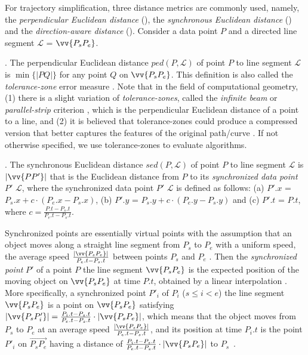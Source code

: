  For trajectory simplification, three distance metrics are commonly used, namely, the \emph{perpendicular Euclidean distance} (\ped), the \emph{synchronous Euclidean distance} \cite{Meratnia:Spatiotemporal} (\sed) and the \emph{direction-aware distance}\cite{Long:Direction, Zhang:Evaluation} (\dad).
%
Consider a data point $P$ and a directed line segment $\mathcal{L}$ = $\vv{P_{s}P_{e}}$.

. The perpendicular Euclidean distance $ped\left(P, \mathcal{L}\right)$ of point $P$ to line segment $\mathcal{L}$ is $\min\{|PQ|\}$ for any point $Q$ on $\vv{P_{s}P_{e}}$.
%
{This definition is also called the \emph{tolerance-zone} error measure \cite{Daescu:metric,Barequet:3D,Chen:Space,Imai:Optimal,Melkman:Optimal}.}
{Note that in the field of computational geometry, (1) there is a slight variation of \emph{tolerance-zones}, called the \emph{infinite beam} or \emph{parallel-strip} criterion \cite{Daescu:metric,Chen:Space}, which is the perpendicular Euclidean distance of a point to a line, and (2) it is believed that tolerance-zones could produce a compressed version that better captures the features of the original path/curve \cite{Daescu:metric,Barequet:3D,Chen:Space}. If not otherwise specified, we use tolerance-zones to evaluate algorithms.}
	
. The synchronous Euclidean distance $sed\left(P, \mathcal{L}\right)$ of point $P$ to line segment $\mathcal{L}$ is $|\vv{PP'}|$ that is the Euclidean distance from $P$ to its \textit{synchronized data point} $P'$ \wrt $\mathcal{L}$, where the synchronized data point $P'$ \wrt $\mathcal{L}$ is defined as follows:
(a) $P'.x$ = $P_s.x +  c\cdot\left(P_e.x - P_s.x\right)$,
(b) $P'.y$ = $P_s.y +  c\cdot\left(P_e.y - P_s.y\right)$ and
(c) $P'.t$ = $P.t$, where $c= \frac{P.t-P_s.t}{P_e.t-P_s.t}$.

{Synchronized points are essentially virtual points with the assumption that an object moves along a straight line segment from $P_s$ to $P_e$ with a uniform speed, \ie the average speed $\frac{|\vv{P_sP_e}|}{P_e.t-P_s.t}$ between points $P_s$ and $P_e$ \cite{Cao:Spatio,Lin:Cised}. Then the \emph{synchronized point} $P'$ of a point $P$ \wrt the line segment $\vv{P_sP_e}$ is the expected position of the moving object on $\vv{P_sP_e}$ at time $P.t$, obtained by a linear interpolation \cite{Cao:Spatio}. More specifically, a synchronized point $P'_i$ of $P_i$ ($s\le i < e$) \wrt the line segment $\vv{P_sP_e}$ is a point on $\vv{P_sP_{e}}$ satisfying ${|\vv{P_sP'_i}|} = \frac{P_i.t - P_s.t}{P_e.t - P_s.t}\cdot {|\vv{P_sP_e}|}$, which means that the object moves from $P_s$ to $P_e$ at an average speed $\frac{|\vv{P_sP_e}|}{P_e.t-P_s.t}$, and its position at time $P_i.t$ is the point $P'_i$ on $\overrightarrow{P_sP_{e}}$ having a distance of $\frac{P_i.t - P_s.t}{P_e.t - P_s.t}\cdot|\vv{P_sP_e}|$ to $P_s$~\cite{Cao:Spatio, Lin:Cised,Meratnia:Spatiotemporal, Chen:Fast, Zhang:Evaluation}.}

